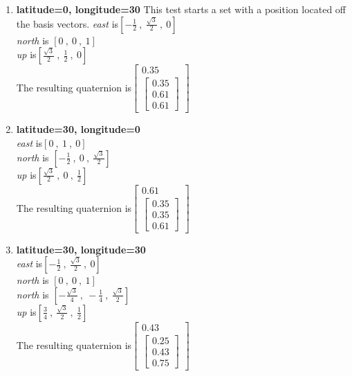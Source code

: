 \documentclass[11pt,fleqn]{report}
\begin{document}
\begin{enumerate}
For the remaining cases, we will not be including the spreadsheet
data in the document. However, the spreadsheet is committed at
\textit{Figs/Q\_enu\_pfix.ods} and has been used to verify that the
model outputs match with the spreadsheet prediction, and that the
spreadsheet prediction produces the expected geometry.

\item \textbf{latitude=0, longitude=30} This test starts a set with a
position located off the basis vectors.
\textit{east} is$[-\frac{1}{2}~,~\frac{\sqrt{3}}{2}~,~0]$ \\
\textit{north} is $[0~,~0~,~1]$ \\
\textit{up} is$[\frac{\sqrt{3}}{2}~,~\frac{1}{2}~,~0]$ \\
The resulting quaternion is$
\begin{bmatrix} 0.35 \\
\begin{bmatrix} 0.35 \\
0.61 \\
0.61
\end{bmatrix}
\end{bmatrix}$
\item \textbf{latitude=30, longitude=0} \\
\textit{east} is$[0~,~1~,~0]$ \\
\textit{north} is $[-\frac{1}{2}~,~0~,~\frac{\sqrt{3}}{2}]$ \\
\textit{up} is$[\frac{\sqrt3}{2}~,~0~,~\frac{1}{2}]$ \\
The resulting quaternion is$
\begin{bmatrix} 0.61 \\
\begin{bmatrix} 0.35 \\
0.35 \\
0.61
\end{bmatrix}
\end{bmatrix}$

\item \textbf{latitude=30, longitude=30}\\
\textit{east} is$[-\frac{1}{2}~,~\frac{\sqrt{3}}{2}~,~0]$ \\
\textit{north} is $[0~,~0~,~1]$ \\
\textit{north} is $[-\frac{\sqrt3}{4}~,~-\frac{1}{4}~,
 ~\frac{\sqrt3}{2}]$ \\
\textit{up} is$[\frac{3}{4}~,~\frac{\sqrt{3}}{2}~,~\frac{1}{2}]$ \\
The resulting quaternion is$
\begin{bmatrix} 0.43 \\
\begin{bmatrix} 0.25 \\
0.43 \\
0.75
\end{bmatrix}
\end{bmatrix}$


\end{enumerate}
\end{document}
